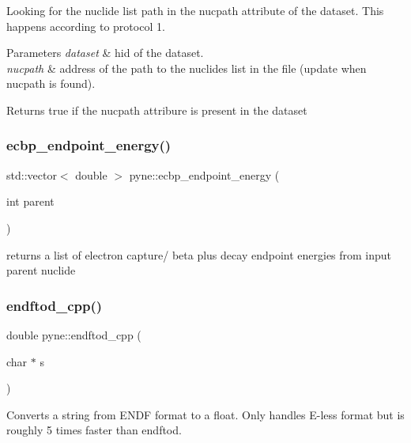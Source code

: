 Looking for the nuclide list path in the nucpath attribute of the dataset. This happens according to protocol 1. 
\begin{DoxyParams}{Parameters}
{\em dataset} & hid of the dataset. \\
\hline
{\em nucpath} & address of the path to the nuclides list in the file (update when nucpath is found). \\
\hline
\end{DoxyParams}
\begin{DoxyReturn}{Returns}
true if the nucpath attribure is present in the dataset 
\end{DoxyReturn}
\mbox{\label{namespacepyne_a01290076b747cd8f6fb8785d698d9319}} 
\subsubsection{\texorpdfstring{ecbp\+\_\+endpoint\+\_\+energy()}{ecbp\_endpoint\_energy()}}
{\footnotesize\ttfamily std\+::vector$<$ double $>$ pyne\+::ecbp\+\_\+endpoint\+\_\+energy (\begin{DoxyParamCaption}\item[{int}]{parent }\end{DoxyParamCaption})}

returns a list of electron capture/ beta plus decay endpoint energies from input parent nuclide \mbox{\label{namespacepyne_a45f290823266c99c35b7b84516087de0}} 
\subsubsection{\texorpdfstring{endftod\+\_\+cpp()}{endftod\_cpp()}}
{\footnotesize\ttfamily double pyne\+::endftod\+\_\+cpp (\begin{DoxyParamCaption}\item[{char $\ast$}]{s }\end{DoxyParamCaption})}

Converts a string from E\+N\+DF format to a float. Only handles E-\/less format but is roughly 5 times faster than endftod. \mbox{\label{namespacepyne_a01d3b4d7c1486b00dc025800d010f3c0}} 
